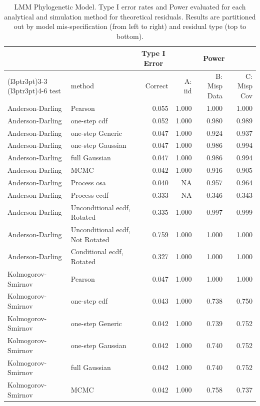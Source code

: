\documentclass[
]{article}
\begin{document}
\begin{table}[H]
\centering
\caption{\label{tab:phylo-results-lmm-theor}LMM Phylogenetic Model. Type I error rates and Power evaluated for each analytical and simulation method for theoretical residuals. Results are partitioned out by model mis-specification (from left to right) and residual type (top to bottom).}
\centering
\begin{tabular}[t]{llrrrr}
\toprule
\multicolumn{1}{c}{ } & \multicolumn{1}{c}{ } & \multicolumn{1}{c}{Type I Error} & \multicolumn{3}{c}{Power} \\
\cmidrule(l{3pt}r{3pt}){3-3} \cmidrule(l{3pt}r{3pt}){4-6}
test & method & Correct & A: iid & B: Misp Data & C: Misp Cov\\
\midrule
Anderson-Darling & Pearson & 0.055 & 1.000 & 1.000 & 1.000\\
Anderson-Darling & one-step cdf & 0.052 & 1.000 & 0.980 & 0.989\\
Anderson-Darling & one-step Generic & 0.047 & 1.000 & 0.924 & 0.937\\
Anderson-Darling & one-step Gaussian & 0.047 & 1.000 & 0.986 & 0.994\\
Anderson-Darling & full Gaussian & 0.047 & 1.000 & 0.986 & 0.994\\
\addlinespace
Anderson-Darling & MCMC & 0.042 & 1.000 & 0.916 & 0.905\\
Anderson-Darling & Process osa & 0.040 & NA & 0.957 & 0.964\\
Anderson-Darling & Process ecdf & 0.333 & NA & 0.346 & 0.343\\
Anderson-Darling & Unconditional ecdf, Rotated & 0.335 & 1.000 & 0.997 & 0.999\\
Anderson-Darling & Unconditional ecdf, Not Rotated & 0.759 & 1.000 & 1.000 & 1.000\\
\addlinespace
Anderson-Darling & Conditional ecdf, Rotated & 0.327 & 1.000 & 1.000 & 1.000\\
Kolmogorov- Smirnov & Pearson & 0.047 & 1.000 & 1.000 & 1.000\\
Kolmogorov- Smirnov & one-step cdf & 0.043 & 1.000 & 0.738 & 0.750\\
Kolmogorov- Smirnov & one-step Generic & 0.042 & 1.000 & 0.739 & 0.752\\
Kolmogorov- Smirnov & one-step Gaussian & 0.042 & 1.000 & 0.740 & 0.752\\
\addlinespace
Kolmogorov- Smirnov & full Gaussian & 0.042 & 1.000 & 0.740 & 0.752\\
Kolmogorov- Smirnov & MCMC & 0.042 & 1.000 & 0.758 & 0.737\\

\end{tabular}
\end{table}
\end{document}
